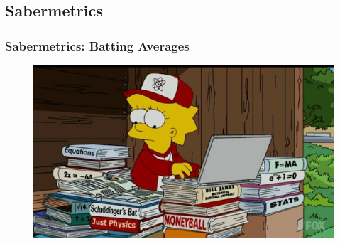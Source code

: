 \documentclass[
  shownotes,
  xcolor={svgnames},
  hyperref={colorlinks,citecolor=DarkBlue,linkcolor=DarkRed,urlcolor=DarkBlue}
  , aspectratio=169]{beamer}
\begin{document}
\subsection{Sabermetrics}
\begin{frame}[fragile]
\frametitle{Sabermetrics: Batting Averages}

\begin{figure}[H] \centering
  \centering
  \includegraphics[scale=0.45]{figures/simpsons-sabermetrics.jpg}
  \\
  \tiny 
\end{figure}
\end{frame}
\end{document}

